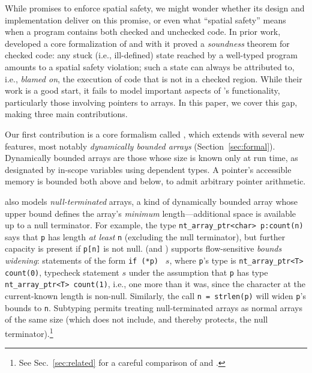 While \checkedc promises to enforce spatial safety, we might wonder
whether its design and implementation deliver on this promise, or even
what ``spatial safety'' means when a program contains both checked and
unchecked code. In prior work, \citet{ruef18checkedc-incr} developed a core
formalization of \checkedc and with it proved a \emph{soundness} theorem for
checked code: any stuck (i.e., ill-defined)
state reached by a well-typed program amounts to a spatial safety
violation; such a state can always be attributed to, i.e., 
\emph{blamed on}, the execution of code that is not in a checked
region. While their work is a good start, 
it fails to model important aspects of \checkedc's functionality,
particularly those involving pointers to arrays. In this paper, we
cover this gap, making three main contributions.

%
Our first contribution is a core formalism called \lang, which extends
\citet{ruef18checkedc-incr} with several new features, most notably 
\emph{dynamically bounded arrays} (Section~\ref{sec:formal}). 
Dynamically bounded arrays are those whose size is
known only at run time, as designated by in-scope variables using
dependent types. A pointer's accessible memory is bounded both above
and below, to admit arbitrary pointer arithmetic.

\lang also models
\emph{null-terminated} arrays, a kind of dynamically bounded array
whose upper bound
defines the array's \emph{minimum} length---additional space is available 
up to a null terminator. For example, the \checkedc type
\lstinline{nt_array_ptr<char> p:count(n)} says that
\lstinline{p} has length \emph{at least} \lstinline{n} (excluding the
null terminator), but further capacity is present if %
\lstinline|p[n]| is not null. \checkedc (and \lang) supports flow-sensitive
\emph{bounds widening}: statements of the form \lstinline|if (*p) | $s$,
where \lstinline{p}'s type is \lstinline{nt_array_ptr<T> count(0)},
typecheck statement $s$ under the assumption that \lstinline{p} has
type \lstinline{nt_array_ptr<T> count(1)}, 
 i.e., one more than it was,
since the character at the current-known length is
non-null. Similarly, the call \lstinline|n = strlen(p)| will widen
\lstinline|p|'s bounds to \lstinline|n|. Subtyping permits treating
null-terminated arrays as normal arrays of the same size (which
does not include, and thereby protects, the null
terminator).\footnote{
    See Sec.~\ref{sec:related} for a careful comparison of
    \citet{ruef18checkedc-incr} and \lang.
}

